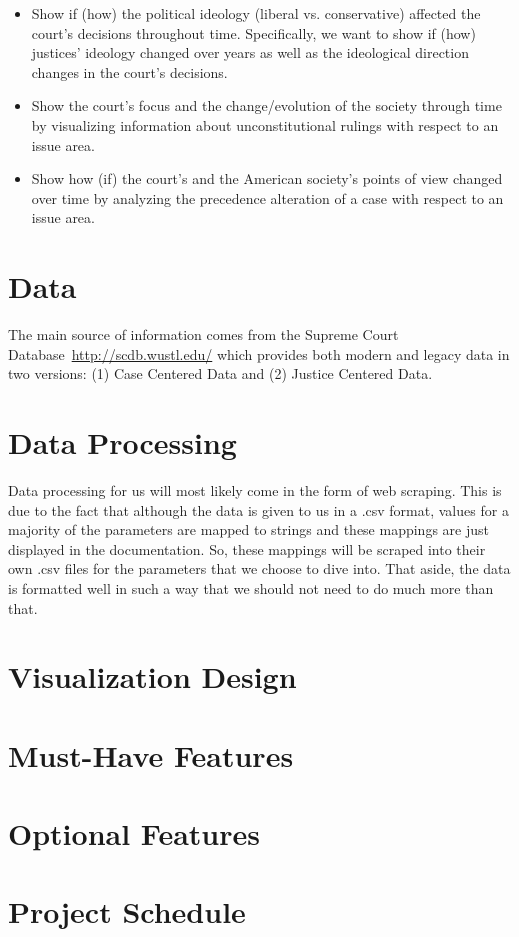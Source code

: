 \documentclass{article}
\begin{document}
\begin{itemize}
  \item Show if (how) the political ideology (liberal vs. conservative) affected the court’s decisions  throughout time. Specifically, we want to show if (how) justices’ ideology changed over years as well as the ideological direction changes in the court’s decisions.
  \item Show the court’s focus and the change/evolution of the society  through time by visualizing information about unconstitutional rulings with respect to an issue area.
\item  Show how (if) the court’s and the American society’s points of view changed over time by analyzing the precedence alteration of a case with respect to an issue area.
\end{itemize}
\section{Data}
The main source of information comes from the Supreme Court Database~\url{http://scdb.wustl.edu/} which provides both modern and legacy data in two versions: (1) Case Centered Data and (2) Justice Centered Data. 
\section{Data Processing}
Data processing for us will most likely come in the form of web scraping. This is due to the fact that although the data is given to us in a .csv format, values for a majority of the parameters are mapped to strings and these mappings are just displayed in the documentation. So, these mappings will be scraped into their own .csv files for the parameters that we choose to dive into. That aside, the data is formatted well in such a way that we should not need to do much more than that.
\section{Visualization Design}

\section{Must-Have Features}
\section{Optional Features}
\section{Project Schedule}
\begin{ganttchart}{1}{12}
 \\
 \\
 \\
 \\
\end{ganttchart}

\printbibliography
\end{document}
